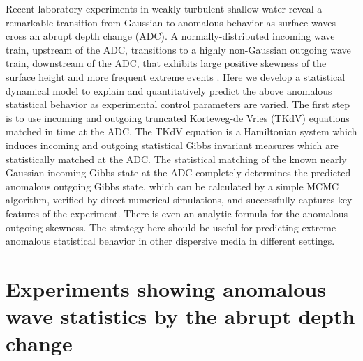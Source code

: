 \documentclass[9pt,twocolumn,twoside,lineno]{pnas-new}
\begin{document}
Recent laboratory experiments in weakly turbulent shallow water reveal a remarkable transition from Gaussian to anomalous behavior as surface waves cross an abrupt depth change (ADC). 
A normally-distributed incoming wave train, upstream of the ADC, transitions to a highly non-Gaussian outgoing wave train, downstream of the ADC, that exhibits large positive skewness of the surface height and more frequent extreme events \cite{bolles2018anomalous}.
Here we develop a statistical dynamical model to explain and quantitatively
predict the above anomalous statistical behavior as experimental control
parameters are varied. The first step is to use incoming and outgoing
truncated Korteweg-de Vries (TKdV) equations matched in time at the
ADC. The TKdV equation is a Hamiltonian system which induces incoming
and outgoing statistical Gibbs invariant measures which are statistically
matched at the ADC. The statistical matching of the known nearly Gaussian
incoming Gibbs state at the ADC completely determines the predicted
anomalous outgoing Gibbs state, which can be calculated by a simple
MCMC algorithm, verified by direct numerical simulations, and successfully
captures key features of the experiment. There is even an analytic
formula for the anomalous outgoing skewness. The strategy here should
be useful for predicting extreme anomalous statistical behavior in
other dispersive media in different settings.


\section{Experiments showing anomalous wave statistics by the abrupt depth change}
\end{document}
